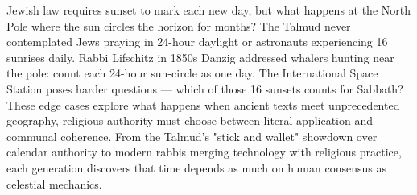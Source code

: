 Jewish law requires sunset to mark each new day, but what happens at the North Pole where the sun circles the horizon for months? The Talmud never contemplated Jews praying in 24-hour daylight or astronauts experiencing 16 sunrises daily. Rabbi Lifschitz in 1850s Danzig addressed whalers hunting near the pole: count each 24-hour sun-circle as one day. The International Space Station poses harder questions — which of those 16 sunsets counts for Sabbath? These edge cases explore what happens when ancient texts meet unprecedented geography, religious authority must choose between literal application and communal coherence. From the Talmud's "stick and wallet" showdown over calendar authority to modern rabbis merging technology with religious practice, each generation discovers that time depends as much on human consensus as celestial mechanics.